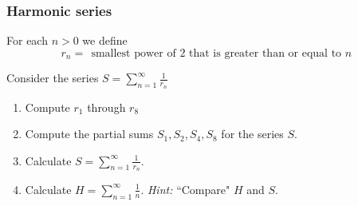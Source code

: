 \documentclass[14pt]{beamer}
\begin{document}
	\begin{frame}[t]
		\fontsize{13}{13}\selectfont
		\frametitle{Harmonic series}

		For each $n >0$ we define
		\[
			r_{n}= \; \, \text{smallest power of $2$ that is greater than or equal to
			$n$}\,
		\]
		\vspace{-.7cm}

		Consider the series $\displaystyle S = \sum_{n=1}^{\infty}\frac{1}{r_{n}}$
		\vspace{.2cm}

		\begin{enumerate}
			\item Compute $\displaystyle r_{1}$ through $\displaystyle r_{8}$
				\vspace{.5cm}

			\item Compute the partial sums $\displaystyle S_{1}, S_{2}, S_{4}, S_{8}$ for
				the series $S$.
				\vspace{.2cm}

			\item Calculate $\displaystyle S = \sum_{n=1}^{\infty}\frac{1}{r_{n}}$.

			\item Calculate $\displaystyle H = \sum_{n=1}^{\infty}\frac{1}{n}$. \hfill
				\emph{Hint:} ``Compare" $H$ and $S$.
		\end{enumerate}
	\end{frame}
\end{document}
